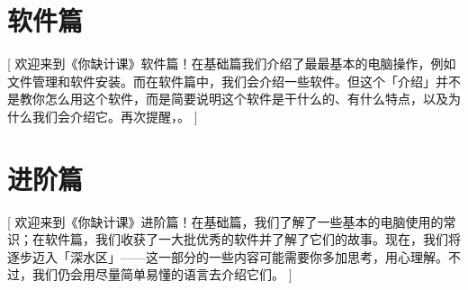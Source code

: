 \documentclass[a4paper]{book}
\begin{document}








\part{软件篇}[
  欢迎来到《你缺计课》软件篇！在基础篇我们介绍了最最基本的电脑操作，例如文件管理和软件安装。而在软件篇中，我们会介绍一些软件。但这个「介绍」并不是教你怎么用这个软件，而是简要说明这个软件是干什么的、有什么特点，以及为什么我们会介绍它。再次提醒，。
]








\part{进阶篇}[
  欢迎来到《你缺计课》进阶篇！在基础篇，我们了解了一些基本的电脑使用的常识；在软件篇，我们收获了一大批优秀的软件并了解了它们的故事。现在，我们将逐步迈入「深水区」——这一部分的一些内容可能需要你多加思考，用心理解。不过，我们仍会用尽量简单易懂的语言去介绍它们。
]


% 
% 
% 


% 
% 

% 
\end{document}
